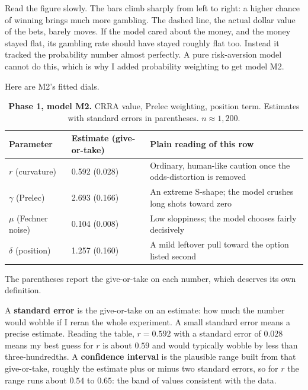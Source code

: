 \documentclass[11pt]{article}
\newcommand{\term}[1]{\textbf{\color{mossdk}#1}}
\begin{document}
Read the figure slowly. The bars climb sharply from left to right: a higher chance of winning brings much
more gambling. The dashed line, the actual dollar value of the bets, barely moves. If the model cared
about the money, and the money stayed flat, its gambling rate should have stayed roughly flat too.
Instead it tracked the probability number almost perfectly. A pure risk-aversion model cannot do this,
which is why I added probability weighting to get model M2.

Here are M2's fitted dials.

\begin{table}[h]
\centering
\small
\caption*{\small\textbf{Phase 1, model M2.} CRRA value, Prelec weighting, position term. Estimates with
standard errors in parentheses. $n \approx 1{,}200$.}
\begin{tabular}{@{}l l >{\RaggedRight}p{2.75in}@{}}
\toprule
\textbf{Parameter} & \textbf{Estimate (give-or-take)} & \textbf{Plain reading of this row} \\
\midrule
$r$ (curvature)       & 0.592 (0.028) & Ordinary, human-like caution once the odds-distortion is removed \\
$\gamma$ (Prelec)     & 2.693 (0.166) & An extreme S-shape; the model crushes long shots toward zero \\
$\mu$ (Fechner noise) & 0.104 (0.008) & Low sloppiness; the model chooses fairly decisively \\
$\delta$ (position)   & 1.257 (0.160) & A mild leftover pull toward the option listed second \\
\bottomrule
\end{tabular}
\end{table}

The parentheses report the give-or-take on each number, which deserves its own definition.

\begin{defbox}
A \term{standard error} is the give-or-take on an estimate: how much the number would wobble if I reran
the whole experiment. A small standard error means a precise estimate. Reading the table, $r = 0.592$
with a standard error of $0.028$ means my best guess for $r$ is about $0.59$ and would typically wobble
by less than three-hundredths. A \term{confidence interval} is the plausible range built from that
give-or-take, roughly the estimate plus or minus two standard errors, so for $r$ the range runs about
$0.54$ to $0.65$: the band of values consistent with the data.
\end{defbox}
\end{document}
